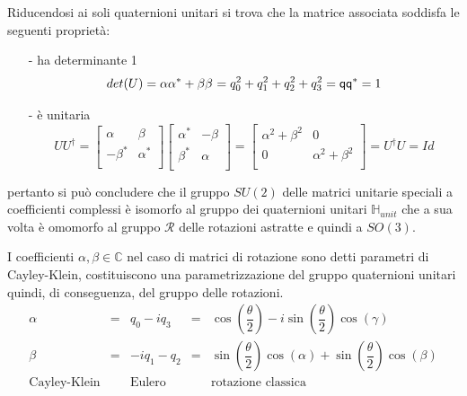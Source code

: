 \documentclass[11pt]{report}
\theoremstyle{plain}
\theoremstyle{definition}
\theoremstyle{remark}
\begin{document}
Riducendosi ai soli quaternioni unitari si trova che la matrice associata soddisfa le seguenti proprietà:
\begin{itemize}
\item[-] ha determinante 1 $$det(U) = \alpha \alpha^{*} + \beta \beta^{\*} = q_{0}^{2} + q_{1}^{2} + q_{2}^{2} + q_{3}^{2} = \mathsf{q} \mathsf{q}^{*} = 1$$
\item[-] è unitaria 
\begin{displaymath}
U U^{\dagger} = 
\left[ \begin{array}{cc}
\alpha & \beta  \\
-\beta^{*} & \alpha^{*}  \\
\end{array} \right] 
\left[ \begin{array}{cc}
\alpha^{*} & -\beta  \\
\beta^{*} & \alpha  \\
\end{array} \right] =
\left[ \begin{array}{cc}
\alpha^{2} + \beta^{2} & 0  \\
0 & \alpha^{2} + \beta^{2}  \\
\end{array} \right] = U^{\dagger} U = Id
\end{displaymath}
\end{itemize}

pertanto si può concludere che il gruppo $SU(2)$ delle matrici unitarie speciali a coefficienti complessi è isomorfo al gruppo dei quaternioni unitari $\mathbb{H}_{unit}$ che a sua volta è omomorfo al gruppo $\mathscr{R}$ delle rotazioni astratte e quindi a $SO(3)$.

I coefficienti $\alpha, \beta \in \mathbb{C}$ nel caso di matrici di rotazione sono detti parametri di Cayley-Klein, costituiscono una parametrizzazione del gruppo quaternioni unitari quindi, di conseguenza, del gruppo delle rotazioni.
\begin{displaymath}
 \begin{array}{ccccc}
\alpha & = & q_{0} - i q_{3} & = & \cos(\dfrac{\theta}{2}) - i \sin(\dfrac{\theta}{2})\cos(\gamma)  \\
\beta & = & -i q_{1} - q_{2} & = & \sin(\dfrac{\theta}{2})\cos(\alpha) + \sin(\dfrac{\theta}{2})\cos(\beta)\\
\textrm{Cayley-Klein} & & \textrm{Eulero} & & \textrm{rotazione classica}
\end{array} 
\end{displaymath}
\end{document}
